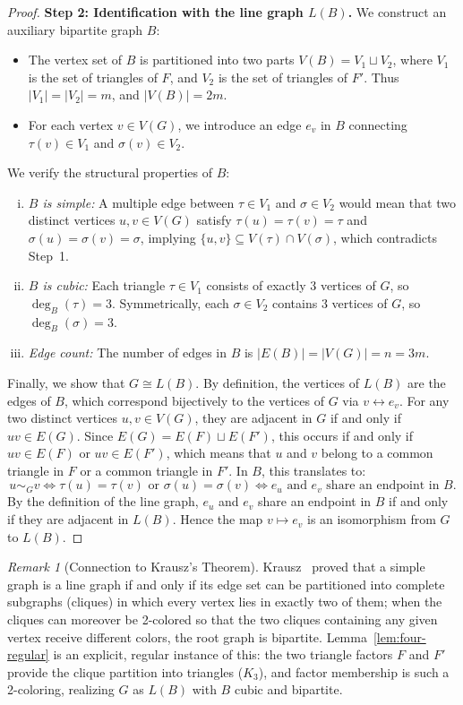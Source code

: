 \documentclass[11pt,reqno]{amsart}
\theoremstyle{definition}
\theoremstyle{remark}
\newtheorem{remark}[theorem]{Remark}
\begin{document}
\begin{proof}
\medskip
\noindent\textbf{Step 2: Identification with the line graph $L(B)$.}
We construct an auxiliary bipartite graph $B$:
\begin{itemize}
    \item The vertex set of $B$ is partitioned into two parts $V(B) = V_1 \sqcup V_2$, where $V_1$ is the set of triangles of $F$, and $V_2$ is the set of triangles of $F'$. Thus $|V_1| = |V_2| = m$, and $|V(B)| = 2m$.
    \item For each vertex $v \in V(G)$, we introduce an edge $e_v$ in $B$ connecting $\tau(v) \in V_1$ and $\sigma(v) \in V_2$.
\end{itemize}
We verify the structural properties of $B$:
\begin{enumerate}[(i)]
    \item \emph{$B$ is simple:} A multiple edge between $\tau \in V_1$ and $\sigma \in V_2$ would mean that two distinct vertices $u, v \in V(G)$ satisfy $\tau(u) = \tau(v) = \tau$ and $\sigma(u) = \sigma(v) = \sigma$, implying $\{u, v\} \subseteq V(\tau) \cap V(\sigma)$, which contradicts Step~1.
    \item \emph{$B$ is cubic:} Each triangle $\tau \in V_1$ consists of exactly 3 vertices of $G$, so $\deg_B(\tau) = 3$. Symmetrically, each $\sigma \in V_2$ contains 3 vertices of $G$, so $\deg_B(\sigma) = 3$.
    \item \emph{Edge count:} The number of edges in $B$ is $|E(B)| = |V(G)| = n = 3m$.
\end{enumerate}
Finally, we show that $G \cong L(B)$. By definition, the vertices of $L(B)$ are the edges of $B$, which correspond bijectively to the vertices of $G$ via $v \leftrightarrow e_v$. For any two distinct vertices $u, v \in V(G)$, they are adjacent in $G$ if and only if $uv \in E(G)$. Since $E(G) = E(F) \sqcup E(F')$, this occurs if and only if $uv \in E(F)$ or $uv \in E(F')$, which means that $u$ and $v$ belong to a common triangle in $F$ or a common triangle in $F'$. In $B$, this translates to:
\[
u \sim_G v \iff \tau(u) = \tau(v) \text{ or } \sigma(u) = \sigma(v) \iff e_u \text{ and } e_v \text{ share an endpoint in } B.
\]
By the definition of the line graph, $e_u$ and $e_v$ share an endpoint in $B$ if and only if they are adjacent in $L(B)$. Hence the map $v \mapsto e_v$ is an isomorphism from $G$ to $L(B)$.
\end{proof}

\begin{remark}[Connection to Krausz's Theorem]\label{rem:krausz}
Krausz~\cite{Krausz43} proved that a simple graph is a line graph if and only if its edge set can be partitioned into complete subgraphs (cliques) in which every vertex lies in exactly two of them; when the cliques can moreover be 2-colored so that the two cliques containing any given vertex receive different colors, the root graph is bipartite. Lemma~\ref{lem:four-regular} is an explicit, regular instance of this: the two triangle factors $F$ and $F'$ provide the clique partition into triangles ($K_3$), and factor membership is such a 2-coloring, realizing $G$ as $L(B)$ with $B$ cubic and bipartite.
\end{remark}
\end{document}
